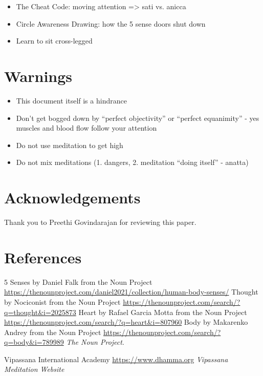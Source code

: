 \documentclass[a4paper, amsfonts, amssymb, amsmath, reprint, showkeys, nofootinbib, twoside]{revtex4-1}
\begin{document}
\begin{itemize}
  \item The Cheat Code: moving attention => sati vs. anicca
  \item Circle Awareness Drawing: how the 5 sense doors shut down
  \item Learn to sit cross-legged
\end{itemize}


\section{Warnings}

\begin{itemize}
  \item This document itself is a hindrance
  \item Don't get bogged down by ``perfect objectivity'' or ``perfect equanimity'' - yes muscles and blood flow follow your attention
  \item Do not use meditation to get high
  \item Do not mix meditations (1. dangers, 2. meditation ``doing itself'' - anatta)
\end{itemize}


\section*{Acknowledgements}

Thank you to Preethi Govindarajan for reviewing this paper.


\section*{References}

\begin{thebibliography}{99}

  5 Senses by Daniel Falk from the Noun Project
  \url{https://thenounproject.com/daniel2021/collection/human-body-senses/}
  Thought by Nociconist from the Noun Project
  \url{https://thenounproject.com/search/?q=thought&i=2025873}
  Heart by Rafael Garcia Motta from the Noun Project
  \url{https://thenounproject.com/search/?q=heart&i=807960}
  Body by Makarenko Andrey from the Noun Project
  \url{https://thenounproject.com/search/?q=body&i=789989}
  \textit{The Noun Project}.

  Vipassana International Academy
  \url{https://www.dhamma.org}
  \textit{Vipassana Meditation Website}


\end{thebibliography}
\end{document}
